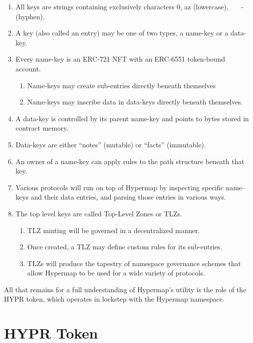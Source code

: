 \documentclass[runningheads]{llncs}
\begin{document}
\begin{enumerate}
    \item All keys are strings containing exclusively characters 0, a\textendash z (lowercase),    - (hyphen).
    \item A key (also called an entry) may be one of two types, a name-key or a data-key.
    \item Every name-key is an ERC-721 NFT with an ERC-6551 token-bound account.
        \begin{enumerate}
            \item Name-keys may create sub-entries directly beneath themselves
            \item Name-keys may inscribe data in data-keys directly beneath themselves.
        \end{enumerate}
    \item A data-key is controlled by its parent name-key and points to bytes stored in contract memory.
    \item Data-keys are either ``notes'' (mutable) or ``facts'' (immutable).
    \item An owner of a name-key can apply rules to the path structure beneath that key.
    \item Various protocols will run on top of Hypermap by inspecting specific name–keys and their data entries, and parsing those entries in various ways.
    \item The top level keys are called Top-Level Zones or TLZs.
        \begin{enumerate}
            \item TLZ minting will be governed in a decentralized manner.
            \item Once created, a TLZ may define custom rules for its sub-entries.
            \item TLZs will produce the tapestry of namespace governance schemes that allow Hypermap to be used for a wide variety of protocols.
        \end{enumerate}
\end{enumerate}

All that remains for a full understanding of Hypermap's utility is the role of the HYPR token, which operates in lockstep with the Hypermap namespace.

\section{HYPR Token}
\label{sec:hypr}
\end{document}
